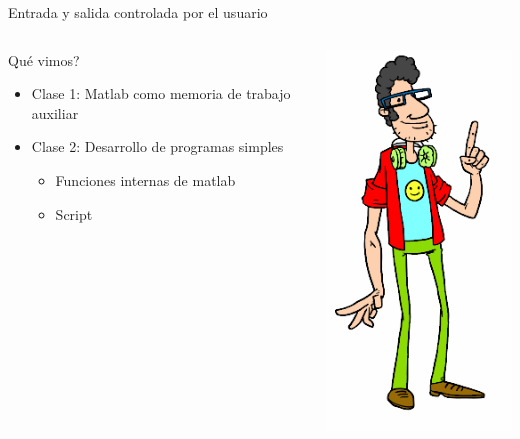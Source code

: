 \documentclass{bredelebeamer}
\begin{document}
\begin{frame}{Entrada y salida controlada por el usuario}
\begin{columns}
\begin{column}{0.5\textwidth}
Qué vimos?
\begin{itemize}
\item Clase 1: Matlab como memoria de trabajo auxiliar
\item Clase 2: Desarrollo de programas simples
\begin{itemize}
\item Funciones internas de matlab
\item Script
\end{itemize}
\end{itemize}
\end{column}
\begin{column}{0.5\textwidth}
\begin{center}
\includegraphics[scale=0.3]{images/img42.png}
\end{center}
\end{column}
\end{columns}
\end{frame}
\end{document}
